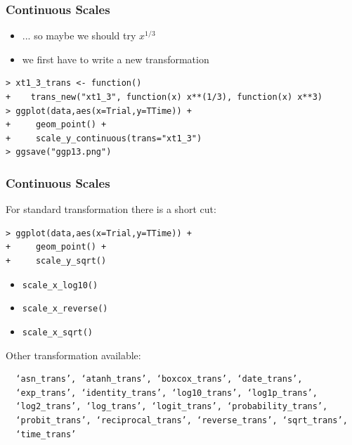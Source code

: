 \documentclass[xcolor={table},c]{beamer}
\begin{document}
\begin{frame}[fragile]\frametitle{Continuous Scales}
  \begin{itemize}
  \item ... so maybe we should try $x^{1/3}$
  \item we first have to write a new transformation\small
  \end{itemize}
\begin{verbatim}
> xt1_3_trans <- function() 
+    trans_new("xt1_3", function(x) x**(1/3), function(x) x**3)
> ggplot(data,aes(x=Trial,y=TTime)) +
+     geom_point() +
+     scale_y_continuous(trans="xt1_3")
> ggsave("ggp13.png")
\end{verbatim}
\begin{center}
\end{center}
\end{frame}


\begin{frame}[fragile]\frametitle{Continuous Scales}
For standard transformation there is a short cut:
\begin{verbatim}
> ggplot(data,aes(x=Trial,y=TTime)) +
+     geom_point() +
+     scale_y_sqrt()
\end{verbatim}
  \begin{itemize}
  \item \texttt{scale\_x\_log10()}
  \item \texttt{scale\_x\_reverse()}
  \item \texttt{scale\_x\_sqrt()}
  \end{itemize}
Other transformation available: \small
\begin{verbatim}
  ‘asn_trans’, ‘atanh_trans’, ‘boxcox_trans’, ‘date_trans’,
  ‘exp_trans’, ‘identity_trans’, ‘log10_trans’, ‘log1p_trans’,
  ‘log2_trans’, ‘log_trans’, ‘logit_trans’, ‘probability_trans’,
  ‘probit_trans’, ‘reciprocal_trans’, ‘reverse_trans’, ‘sqrt_trans’,
  ‘time_trans’
\end{verbatim}
\end{frame}
\end{document}
